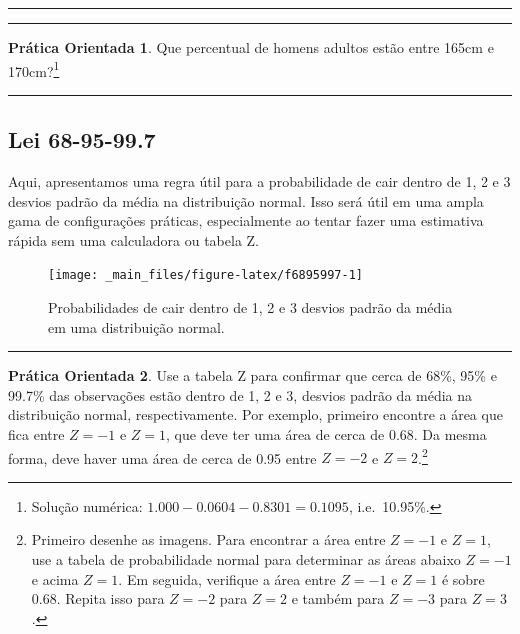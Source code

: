 \documentclass[
]{book}
\theoremstyle{definition}
\theoremstyle{definition}
\theoremstyle{definition}
\newtheorem{exercise}{Prática Orientada}[chapter]
\theoremstyle{definition}
\theoremstyle{remark}
\begin{document}
\begin{center}\rule{0.5\linewidth}{0.5pt}\end{center}

\begin{center}\rule{0.5\linewidth}{0.5pt}\end{center}

\begin{exercise}
\protect\hypertarget{exr:unnamed-chunk-115}{}{\label{exr:unnamed-chunk-115} }Que percentual de homens adultos estão entre 165cm e 170cm?\footnote{Solução numérica: \(1.000 - 0.0604 - 0.8301 = 0.1095\), i.e.~10.95\%.}
\end{exercise}

\begin{center}\rule{0.5\linewidth}{0.5pt}\end{center}

\hypertarget{rule689599}{%
\subsection{Lei 68-95-99.7}\label{rule689599}}

Aqui, apresentamos uma regra útil para a probabilidade de cair dentro de 1, 2 e 3 desvios padrão da média na distribuição normal. Isso será útil em uma ampla gama de configurações práticas, especialmente ao tentar fazer uma estimativa rápida sem uma calculadora ou tabela Z.

\begin{figure}

{\centering \texttt{[image: \_main\_files/figure-latex/f6895997-1]} 

}

\caption{Probabilidades de cair dentro de 1, 2 e 3 desvios padrão da média em uma distribuição normal.}\label{fig:f6895997}
\end{figure}

\begin{center}\rule{0.5\linewidth}{0.5pt}\end{center}

\begin{exercise}
\protect\hypertarget{exr:unnamed-chunk-116}{}{\label{exr:unnamed-chunk-116} }Use a tabela Z para confirmar que cerca de 68\%, 95\% e 99.7\% das observações estão dentro de 1, 2 e 3, desvios padrão da média na distribuição normal, respectivamente. Por exemplo, primeiro encontre a área que fica entre \(Z=-1\) e \(Z=1\), que deve ter uma área de cerca de 0.68. Da mesma forma, deve haver uma área de cerca de 0.95 entre \(Z=-2\) e \(Z=2\).\footnote{Primeiro desenhe as imagens. Para encontrar a área entre \(Z=-1\) e \(Z=1\), use a tabela de probabilidade normal para determinar as áreas abaixo \(Z=-1\) e acima \(Z=1\). Em seguida, verifique a área entre \(Z=-1\) e \(Z=1\) é sobre 0.68. Repita isso para \(Z=-2\) para \(Z=2\) e também para \(Z=-3\) para \(Z=3\).}
\end{exercise}
\end{document}
